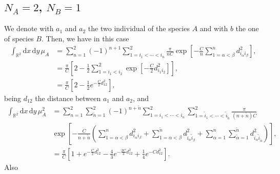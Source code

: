 \documentclass[12pt]{article}
\newcommand{\xd}{\mathrm{d}}
\numberwithin{equation}{section} %
\numberwithin{figure}{section} %
\theoremstyle{definition}
\begin{document}
\subsection{\texorpdfstring{$N_A=2$}{NA=1}, \texorpdfstring{$N_B=1$}{NB=1}}
We denote with $a_1$ and $a_2$ the two individual of the species $A$ and with $b$ the one of species $B$.  Then, we have in this case
\begin{align}
\int_{{\mathbb R}^2} \xd x \, \xd y \, \mu_A&= \sum_{n=1}^{2} (-1)^{n+1} \sum_{ 1=i_1< \cdots <i_n }^{2} \frac{\pi}{nC} \exp \left[ - \frac{C}{n} \sum_{1=\alpha < \beta}^n d_{i_{\alpha} i_{\beta}}^2 \right], \\
&= \frac{\pi}{C} \left[ 2 - \frac12  \sum_{ 1=i_1< i_2}^{2} \exp \left[- \frac{C}{2}  d_{i_{1} i_{2}}^2 \right]  \right], \\
&= \frac{\pi}{C} \left[ 2 - \frac12  e^{- \frac{C}{2}  d_{{1} {2}}^2 } \right],
\end{align}
being $d_{12}$ the distance between $a_1$ and $a_2$, and
\begin{align}
\int_{{\mathbb R}^2} \xd x \, \xd y \, \mu_A^2 &=  \sum_{n=1}^{2} \sum_{\tilde{n}=1}^{2} (-1)^{n+\tilde{n}} \sum_{ 1=i_1< \cdots <i_n }^{2} \sum_{ 1=\tilde{i}_1< \cdots <\tilde{i}_{\tilde{n}} }^{2} \frac{\pi}{(n+\tilde{n})C}
 \nonumber\\
& \exp \left[ - \frac{C}{n+\tilde{n}} \left( \sum_{1=\alpha < \beta}^n d_{i_{\alpha} i_{\beta}}^2 + \sum_{1=\alpha < \beta}^{\tilde{n}} d_{\tilde{i}_{\alpha} \tilde{i}_{\beta}}^2 +
\sum_{\alpha=1}^n \sum_{\tilde{\alpha}=1}^{\tilde{n}}  d_{i_{\alpha} \tilde{i}_{\tilde{\alpha}}}^2 \right) \right], \\
&= \frac{\pi}{C} \left[ 1+e^{- \frac{C}{2}d^2_{12}} - \frac{4}{3} e^{- \frac{2C}{3} d^2_{1 2} } + \frac{1}{4} e^{- C d_{12}^2 }  \right].
\end{align}
Also
\end{document}
